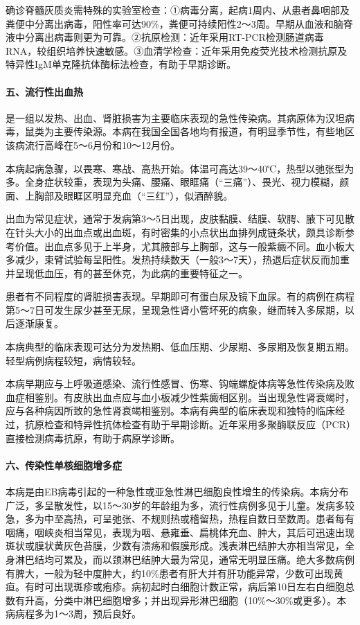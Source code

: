 确诊脊髓灰质炎需特殊的实验室检查：①病毒分离，起病1周内、从患者鼻咽部及粪便中分离出病毒，阳性率可达90\%，粪便可持续阳性2～3周。早期从血液和脑脊液中分离出病毒则更为可靠。②抗原检测：近年采用RT-PCR检测肠道病毒RNA，较组织培养快速敏感。③血清学检查：近年采用免疫荧光技术检测抗原及特异性IgM单克隆抗体酶标法检查，有助于早期诊断。

\paragraph{五、流行性出血热}

是一组以发热、出血、肾脏损害为主要临床表现的急性传染病。其病原体为汉坦病毒，鼠类为主要传染源。本病在我国全国各地均有报道，有明显季节性，有些地区该病流行高峰在5～6月份和10～12月份。

本病起病急骤，以畏寒、寒战、高热开始。体温可高达39～40℃，热型以弛张型为多。全身症状较重，表现为头痛、腰痛、眼眶痛（“三痛”）、畏光、视力模糊，颜面、上胸部及眼眶区明显充血（“三红”），似酒醉貌。

出血为常见症状，通常于发病第3～5日出现，皮肤黏膜、结膜、软腭、腋下可见散在针头大小的出血点或出血斑，有时密集的小点状出血排列成链条状，颇具诊断参考价值。出血点多见于上半身，尤其腋部与上胸部，这与一般紫癜不同。血小板大多减少，束臂试验每呈阳性。发热持续数天（一般3～7天），热退后症状反而加重并呈现低血压，有的甚至休克，为此病的重要特征之一。

患者有不同程度的肾脏损害表现。早期即可有蛋白尿及镜下血尿。有的病例在病程第5～7日可发生尿少甚至无尿，呈现急性肾小管坏死的病象，继而转入多尿期，以后逐渐康复。

本病典型的临床表现可达分为发热期、低血压期、少尿期、多尿期及恢复期五期。轻型病例病程较短，病情较轻。

本病早期应与上呼吸道感染、流行性感冒、伤寒、钩端螺旋体病等急性传染病及败血症相鉴别。有皮肤出血点应与血小板减少性紫癜相区别。当出现急性肾衰竭时，应与各种病因所致的急性肾衰竭相鉴别。本病有典型的临床表现和独特的临床经过，抗原检查和特异性抗体检查有助于早期诊断。近年采用多聚酶联反应（PCR）直接检测病毒抗原，有助于病原学诊断。

\paragraph{六、传染性单核细胞增多症}

本病是由EB病毒引起的一种急性或亚急性淋巴细胞良性增生的传染病。本病分布广泛，多呈散发性，以15～30岁的年龄组为多，流行性病例多见于儿童。发病多较急，多为中至高热，可呈弛张、不规则热或稽留热，热程自数日至数周。患者每有咽痛，咽峡炎相当常见，表现为咽、悬雍垂、扁桃体充血、肿大，其后可迅速出现斑状或膜状黄灰色苔膜，少数有溃疡和假膜形成。浅表淋巴结肿大亦相当常见，全身淋巴结均可累及，而以颈淋巴结肿大最为常见，通常无明显压痛。绝大多数病例有脾大，一般为轻中度肿大，约10\%患者有肝大并有肝功能异常，少数可出现黄疸。有时可出现斑疹或疱疹。病初起时白细胞计数正常，病后第10日左右白细胞总数有升高，分类中淋巴细胞增多；并出现异形淋巴细胞（10\%～30\%或更多）。本病病程多为1～3周，预后良好。

